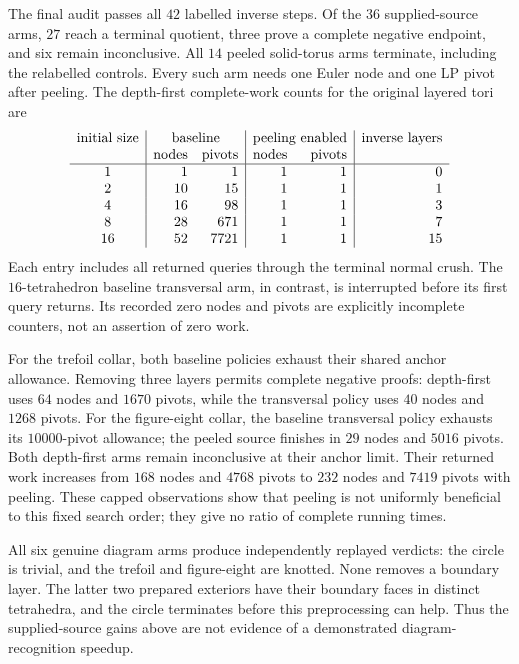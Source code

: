 The final audit passes all $42$ labelled inverse steps.  Of the $36$
supplied-source arms, $27$ reach a terminal quotient, three prove a
complete negative endpoint, and six remain inconclusive.  All $14$
peeled solid-torus arms terminate, including the relabelled controls.
Every such arm needs one Euler node and one LP pivot after peeling.
The depth-first complete-work counts for the original layered tori are
\[
\begin{array}{c|rr|rr|r}
\text{initial size}&\multicolumn{2}{c|}{\text{baseline}}&
 \multicolumn{2}{c|}{\text{peeling enabled}}&\text{inverse layers}\\
 &\text{nodes}&\text{pivots}&\text{nodes}&\text{pivots}&\\ \hline
1&1&1&1&1&0\\
2&10&15&1&1&1\\
4&16&98&1&1&3\\
8&28&671&1&1&7\\
16&52&7721&1&1&15
\end{array}
\]
Each entry includes all returned queries through the terminal normal
crush.  The $16$-tetrahedron baseline transversal arm, in contrast,
is interrupted before its first query returns.  Its recorded zero
nodes and pivots are explicitly incomplete counters, not an assertion
of zero work.

For the trefoil collar, both baseline policies exhaust their shared
anchor allowance.  Removing three layers permits complete negative
proofs: depth-first uses $64$ nodes and $1670$ pivots, while the
transversal policy uses $40$ nodes and $1268$ pivots.  For the
figure-eight collar, the baseline transversal policy exhausts its
$10000$-pivot allowance; the peeled source finishes in $29$ nodes and
$5016$ pivots.  Both depth-first arms remain inconclusive at their
anchor limit.  Their returned work increases from $168$ nodes and
$4768$ pivots to $232$ nodes and $7419$ pivots with peeling.  These
capped observations show that peeling is not uniformly beneficial to
this fixed search order; they give no ratio of complete running times.

All six genuine diagram arms produce independently replayed verdicts:
the circle is trivial, and the trefoil and figure-eight are knotted.
None removes a boundary layer.  The latter two prepared exteriors have
their boundary faces in distinct tetrahedra, and the circle terminates
before this preprocessing can help.  Thus the supplied-source gains
above are not evidence of a demonstrated diagram-recognition speedup.

